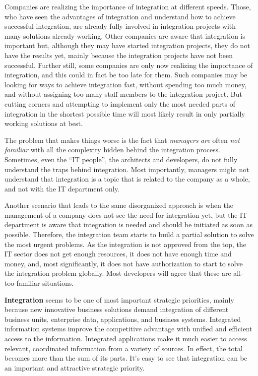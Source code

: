 Companies are realizing the importance of integration at different speeds. Those, who have seen the advantages of integration and understand how to achieve successful integration, are already fully involved in integration projects with many solutions already working. Other companies are aware that integration is important but, although they may have started integration projects, they do not have the results yet, mainly because the integration projects have not been successful. Further still, some companies are only now realizing the importance of integration, and this could in fact be too late for them. Such companies may be looking for ways to achieve integration fast, without spending too much money, and without assigning too many staff members to the integration project. But cutting corners and attempting to implement only the most needed parts of integration in the shortest possible time will most likely result in only partially working solutions at best.

The problem that makes things worse is the fact that \textit{managers are} often \textit{not familiar} with all the complexity hidden behind the integration process. Sometimes, even the ``IT people'', the architects and developers, do not fully understand the traps behind integration. Most importantly, managers might not understand that integration is a topic that is related to the company as a whole, and not with the IT department only.

Another scenario that leads to the same disorganized approach is when the management of a company does not see the need for integration yet, but the IT department is aware that integration is needed and should be initiated as soon as possible. Therefore, the integration team starts to build a partial solution to solve the most urgent problems. As the integration is not approved from the top, the IT sector does not get enough resources, it does not have enough time and money, and, most significantly, it does not have authorization to start to solve the integration problem globally. Most developers will agree that these are all-too-familiar situations.

\textbf{Integration} seems to be one of most important strategic priorities, mainly because new innovative business solutions demand integration of different business units, enterprise data, applications, and business systems. Integrated information systems improve the competitive advantage with unified and efficient access to the information. Integrated applications make it much easier to access relevant, coordinated information from a variety of sources. In effect, the total becomes more than the sum of its parts. It's easy to see that integration can be an important and attractive strategic priority.

